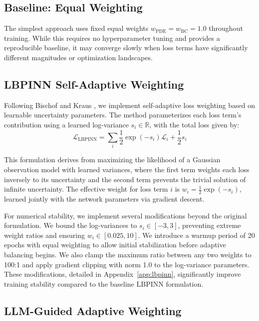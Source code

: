 \documentclass{article}
\begin{document}
\subsection{Baseline: Equal Weighting}

The simplest approach uses fixed equal weights $w_{\text{PDE}} = w_{\text{BC}} = 1.0$ throughout training. While this requires no hyperparameter tuning and provides a reproducible baseline, it may converge slowly when loss terms have significantly different magnitudes or optimization landscapes.

\subsection{LBPINN Self-Adaptive Weighting}

Following Bischof and Kraus \citep{Bischof2021LBPINN}, we implement self-adaptive loss weighting based on learnable uncertainty parameters. The method parameterizes each loss term's contribution using a learned log-variance $s_i \in \mathbb{R}$, with the total loss given by:
\begin{equation}
\mathcal{L}_{\text{LBPINN}} = \sum_{i} \frac{1}{2}\exp(-s_i) \mathcal{L}_i + \frac{1}{2}s_i
\label{eq:lbpinn_loss}
\end{equation}

This formulation derives from maximizing the likelihood of a Gaussian observation model with learned variances, where the first term weights each loss inversely to its uncertainty and the second term prevents the trivial solution of infinite uncertainty. The effective weight for loss term $i$ is $w_i = \frac{1}{2}\exp(-s_i)$, learned jointly with the network parameters via gradient descent.

For numerical stability, we implement several modifications beyond the original formulation. We bound the log-variances to $s_i \in [-3, 3]$, preventing extreme weight ratios and ensuring $w_i \in [0.025, 10]$. We introduce a warmup period of 20 epochs with equal weighting to allow initial stabilization before adaptive balancing begins. We also clamp the maximum ratio between any two weights to 100:1 and apply gradient clipping with norm 1.0 to the log-variance parameters. These modifications, detailed in Appendix~\ref{app:lbpinn}, significantly improve training stability compared to the baseline LBPINN formulation.

\subsection{LLM-Guided Adaptive Weighting}
\end{document}
